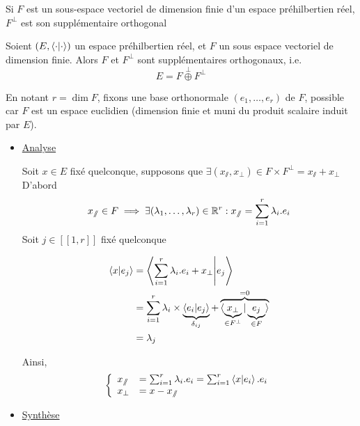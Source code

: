 \documentclass{article}
\renewenvironment{question_kholle}[2][ ]
{
	\subsection{\texorpdfstring{#2}{}}
	\notblank{#1}
	{
		\noindent #1
		\bigbreak
	}
	{}
	\begin{proof}
}
{
	\end{proof}
}
\begin{document}
\begin{question_kholle}{Si $F$ est un sous-espace vectoriel de dimension finie d'un espace préhilbertien réel, $F^{\perp}$ est son supplémentaire orthogonal}


	Soient $(E, \braket{ \cdot | \cdot })$ un espace préhilbertien réel, et $F$ un sous espace vectoriel de dimension finie.
	Alors $F$ et $F^{\perp}$ sont supplémentaires orthogonaux, i.e.
	\begin{equation}
		E = F  \overset{\perp}{\oplus} F^{\perp}
	\end{equation}



	En notant $r = \dim F$, fixons une base orthonormale $(e_{1}, \dots, e_{r})$ de $F$, possible car $F$ est un espace euclidien (dimension finie et muni du produit scalaire induit par $E$).
	\begin{itemize}[label=$\lozenge$]
		\item \underline{Analyse}

		      Soit $x \in E$ fixé quelconque, supposons que $\exists (x_{\sslash}, x_{\perp}) \in F \times F^{\perp} = x_{\sslash}+x_{\perp}$
		      D'abord $$x_{\sslash} \in F \implies \exists (\lambda_{1}, \dots, \lambda_{r}) \in \mathbb R^{r}: x_{\sslash}= \sum_{i=1}^{r}\lambda_{i}.e_{i}$$
		      Soit $j \in [ \! [ 1, r ] \!]$ fixé quelconque

		      \begin{align*}
			      \braket{ x | e_{j} } & =   \left\langle \sum_{i=1}^{r}\lambda_{i}.e_{i} + x_{\perp} \Bigg| e_{j}  \right\rangle                                                                                                                 \\
			                           & = \sum_{i=1}^{r}\lambda_{i}\times \underbrace{ \braket{ e_{i} | e_{j} } }_{ \delta_{ij} }  + \overbrace{ \braket{ \underbrace{ x_{\perp} }_{ \in F^{\perp} } | \underbrace{ e_{j} }_{ \in F } } }^{ =0 } \\
			                           & = \lambda_{j}
		      \end{align*}

		      Ainsi, $$\left\{ \begin{array}{ll}
				      x_{\sslash} & = \sum_{i=1}^{r}\lambda_{i}.e_{i}= \sum_{i=1}^{r}\braket{ x | e_{i} } . e_{i} \\
				      x_{\perp}   & = x - x_{\sslash}
			      \end{array}\right.$$

		\item \underline{Synthèse}


\end{itemize}
\end{question_kholle}
\end{document}
